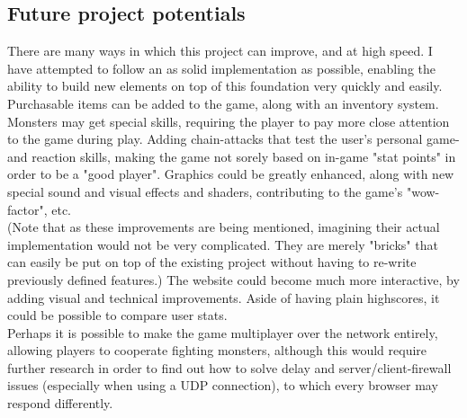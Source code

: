 \documentclass[12pt]{report}
\begin{document}
\subsection*{Future project potentials}
There are many ways in which this project can improve, and at high speed. I have attempted to follow an as solid implementation as possible, enabling the ability to build new elements on top of this foundation very quickly and easily.\\
Purchasable items can be added to the game, along with an inventory system. Monsters may get special skills, requiring the player to pay more close attention to the game during play. Adding chain-attacks that test the user's personal game- and reaction skills, making the game not sorely based on in-game "stat points" in order to be a "good player". Graphics could be greatly enhanced, along with new special sound and visual effects and shaders, contributing to the game's "wow-factor", etc.\\(Note that as these improvements are being mentioned, imagining their actual implementation would not be very complicated. They are merely "bricks" that can easily be put on top of the existing project without having to re-write previously defined features.)
The website could become much more interactive, by adding visual and technical improvements. Aside of having plain highscores, it could be possible to compare user stats.\\
Perhaps it is possible to make the game multiplayer over the network entirely, allowing players to cooperate fighting monsters, although this would require further research in order to find out how to solve delay and server/client-firewall issues (especially when using a UDP connection), to which every browser may respond differently.
\end{document}

